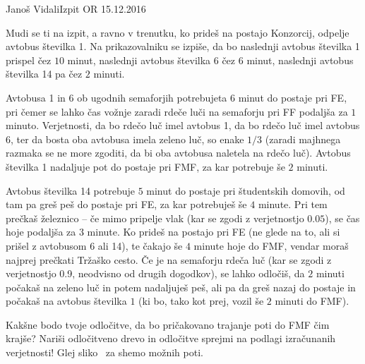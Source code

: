 \begin{naloga}{Janoš Vidali}{Izpit OR 15.12.2016}
\begin{vprasanje}[avtobus]
Mudi se ti na izpit, a ravno v trenutku,
ko prideš na postajo Konzorcij, odpelje avtobus številka 1.
Na prikazovalniku se izpiše,
da bo naslednji avtobus številka 1 prispel čez $10$ minut,
naslednji avtobus številka 6 čez $6$ minut,
naslednji avtobus številka 14 pa čez $2$ minuti.

Avtobusa 1 in 6 ob ugodnih semaforjih potrebujeta $6$ minut do postaje pri FE,
pri čemer se lahko čas vož\-nje zaradi rdeče luči na semaforju pri FF
podaljša za $1$ minuto.
Verjetnosti, da bo rdečo luč imel avtobus 1, da bo rdečo luč imel avtobus 6,
ter da bosta oba avtobusa imela zeleno luč, so enake $1/3$
(zaradi majhnega razmaka se ne more zgoditi,
da bi oba avtobusa naletela na rdečo luč).
Avtobus številka 1 nadaljuje pot do postaje pri FMF,
za kar potrebuje še $2$ minuti.

Avtobus številka 14 potrebuje $5$ minut do postaje pri študentskih domovih,
od tam pa greš peš do postaje pri FE, za kar potrebuješ še $4$ minute.
Pri tem prečkaš že\-lez\-ni\-co -- če mimo pripelje vlak
(kar se zgodi z verjetnostjo $0.05$),
se čas hoje podaljša za $3$ minute.
Ko prideš na postajo pri FE
(ne glede na to, ali si prišel z avtobusom 6 ali 14),
te čakajo še $4$ minute hoje do FMF,
vendar moraš najprej prečkati Tržaško cesto.
Če je na semaforju rdeča luč
(kar se zgodi z verjetnostjo 0.9, neodvisno od drugih dogodkov),
se lahko odločiš, da $2$ minuti počakaš na zeleno luč in potem nadaljuješ peš,
ali pa da greš nazaj do postaje in počakaš na avtobus številka $1$
(ki bo, tako kot prej, vozil še $2$ minuti do FMF).

Kakšne bodo tvoje odločitve,
da bo pričakovano trajanje poti do FMF čim krajše?
Nariši od\-lo\-čit\-ve\-no drevo
in odločitve sprejmi na podlagi izračunanih verjetnosti!
Glej sliko~\fig{} za shemo možnih poti.

\begin{slika}
\pgfslika
{}
\end{slika}
\end{vprasanje}
\begin{odgovor}
\end{odgovor}
\end{naloga}


